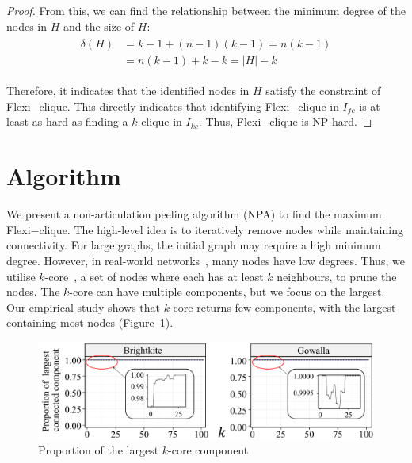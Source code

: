 \documentclass[sigconf]{acmart}
\newcommand{\flexi}{\textsf{Flexi$-$clique}}
\newcommand{\NPA}{\textsf{NPA}}
\begin{document}
\begin{proof}
From this, we can find the relationship between the minimum degree of the nodes in $H$ and the size of $H$:
\begin{align}
\begin{aligned}
\delta(H) &= k-1 + (n-1)(k-1) = n(k-1) \\
&= n(k-1) + k - k = |H| - k
\end{aligned}
\end{align}

Therefore, it indicates that the identified nodes in $H$ satisfy the constraint of {\flexi}. This directly indicates that identifying {\flexi} in $I_{fc}$ is at least as hard as finding a $k$-clique in $I_{kc}$. Thus, {\flexi} is NP-hard.
\end{proof}





\section{Algorithm}

We present a non-articulation peeling algorithm ({\NPA}) to find the maximum {\flexi}. The high-level idea is to iteratively remove nodes while maintaining connectivity. For large graphs, the initial graph may require a high minimum degree. However, in real-world networks~\cite{clauset2009power, barabasi1999emergence}, many nodes have low degrees. Thus, we utilise $k$-core~\cite{seidman1983network}, a set of nodes where each has at least $k$ neighbours, to prune the nodes. The $k$-core can have multiple components, but we focus on the largest. Our empirical study shows that $k$-core returns few components, with the largest containing most nodes (Figure~\ref{fig:proportion}).

\begin{figure}[t]
\centering
\includegraphics[width=0.85\linewidth]{figures/proportion_0.pdf}
\vspace{-0.3cm}
\caption{Proportion of the largest $k$-core component}  
\vspace{-0.35cm}
\label{fig:proportion}
\end{figure}
\end{document}
